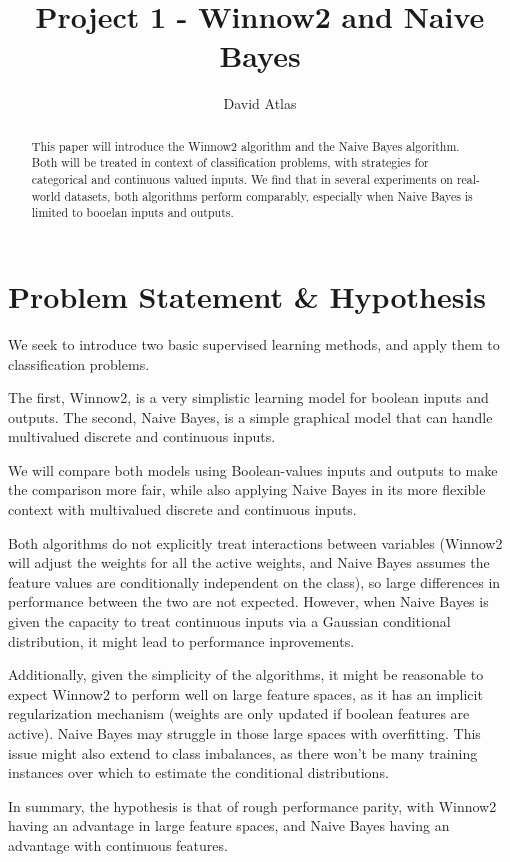 \documentclass{amsart}
\title{Project 1 - Winnow2 and Naive Bayes}
\author{David Atlas}
\begin{document}
    \begin{abstract}
        This paper will introduce the Winnow2 algorithm and the Naive Bayes algorithm. Both will be treated in
        context of classification problems, with strategies for categorical and continuous valued inputs.
        We find that in several experiments on real-world datasets,
        both algorithms perform comparably, especially when Naive Bayes is
        limited to booelan inputs and outputs.
    \end{abstract}
    \maketitle
    \section{Problem Statement \& Hypothesis}
    We seek to introduce two basic supervised learning methods, and apply them to classification problems.


    The first, Winnow2, is a very simplistic learning model for boolean inputs and outputs. The second,
    Naive Bayes, is a simple graphical model that can handle multivalued discrete and continuous inputs.

    We will compare both models using Boolean-values inputs and outputs to make the comparison more fair, while also
    applying Naive Bayes in its more flexible context with multivalued discrete and continuous inputs.

    Both algorithms do not explicitly treat interactions between variables (Winnow2 will adjust the weights
    for all the active weights, and Naive Bayes assumes the feature values are conditionally independent on the class),
    so large differences in performance between the two are not expected. However, when Naive Bayes is given the
    capacity to treat continuous inputs via a Gaussian conditional distribution, it might lead to performance inprovements.

    Additionally, given the simplicity of the algorithms, it might be reasonable to expect Winnow2 to perform well on
    large feature spaces, as it has an implicit regularization mechanism (weights are only updated if boolean
    features are active). Naive Bayes may struggle in those large spaces with overfitting. This issue might also extend to
    class imbalances, as there won't be many training instances over which to estimate the conditional distributions.

    In summary, the hypothesis is that of rough performance parity, with Winnow2 having an advantage in large
    feature spaces, and Naive Bayes having an advantage with continuous features.
\end{document}
